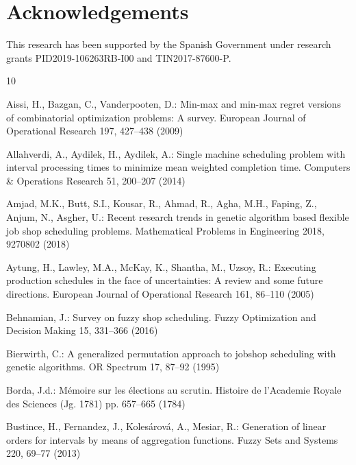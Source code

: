 \documentclass[12pt,halfline,a4paper]{ouparticle}
\begin{document}
\section*{Acknowledgements}
This research has been supported by the Spanish Government under research grants PID2019-106263RB-I00 and TIN2017-87600-P.

%
%
\begin{thebibliography}{10}
\providecommand{\url}[1]{\texttt{#1}}
\providecommand{\urlprefix}{URL }

Aissi, H., Bazgan, C., Vanderpooten, D.: Min-max and min-max regret versions of
  combinatorial optimization problems: A survey. European Journal of
  Operational Research  197,  427--438 (2009)

Allahverdi, A., Aydilek, H., Aydilek, A.: Single machine scheduling problem
  with interval processing times to minimize mean weighted completion time.
  Computers \& Operations Research  51,  200--207 (2014)

Amjad, M.K., Butt, S.I., Kousar, R., Ahmad, R., Agha, M.H., Faping, Z., Anjum,
  N., Asgher, U.: Recent research trends in genetic algorithm based flexible
  job shop scheduling problems. Mathematical Problems in Engineering  2018,
  9270802 (2018)

Aytung, H., Lawley, M.A., Mc{K}ay, K., Shantha, M., Uzsoy, R.: Executing
  production schedules in the face of uncertainties: {A} review and some future
  directions. European Journal of Operational Research  161,  86--110 (2005)

Behnamian, J.: Survey on fuzzy shop scheduling. Fuzzy Optimization and Decision
  Making  15,  331--366 (2016)

Bierwirth, C.: A generalized permutation approach to jobshop scheduling with
  genetic algorithms. {OR} Spectrum  17,  87--92 (1995)

Borda, J.d.: M{\'e}moire sur les {\'e}lections au scrutin. Histoire de
  l'Academie Royale des Sciences (Jg. 1781) pp. 657--665 (1784)

Bustince, H., Fernandez, J., Koles\'arov\'a, A., Mesiar, R.: Generation of
  linear orders for intervals by means of aggregation functions. Fuzzy Sets and
  Systems  220,  69--77 (2013)


\end{thebibliography}
\end{document}
